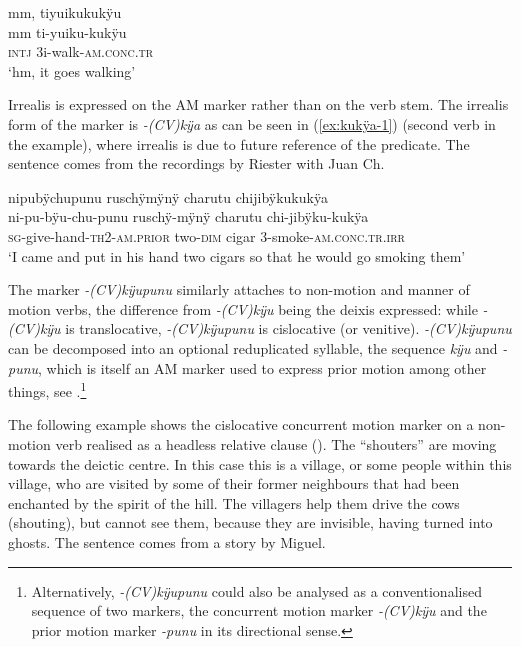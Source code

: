 \ea\label{ex:kukÿu-manner-3}
\begingl 
\glpreamble mm, tiyuikukukÿu\\
\gla mm ti-yuiku-kukÿu\\ 
\glb \textsc{intj} 3i-walk-\textsc{am.conc.tr}\\ 
\glft ‘hm, it goes walking’\\ 
\endgl
\trailingcitation{[mox-e110914l-1.150]}
\xe

Irrealis is expressed on the AM marker rather than on the verb stem. The irrealis form of the marker is \textit{-(CV)kÿa} as can be seen in (\ref{ex:kukÿa-1}) (second verb in the example), where irrealis is due to future reference of the predicate. The sentence comes from the recordings by Riester with Juan Ch.

\ea\label{ex:kukÿa-1}
\begingl 
\glpreamble nipubÿchupunu ruschÿmÿnÿ charutu chijibÿkukukÿa\\
\gla ni-pu-bÿu-chu-punu ruschÿ-mÿnÿ charutu chi-jibÿku-kukÿa\\ 
\textsc{sg}-give-hand-\textsc{th}2-\textsc{am.prior} two-\textsc{dim} cigar 3-smoke-\textsc{am.conc.tr.irr}\\ 
\glft ‘I came and put in his hand two cigars so that he would go smoking them’\\ 
\endgl
\trailingcitation{[nxx-p630101g-1.035-036]}
\xe


The marker \textit{-(CV)kÿupunu} similarly attaches to non-motion and  manner of motion verbs, the difference from \textit{-(CV)kÿu} being the deixis expressed: while \textit{-(CV)kÿu} is translocative, \textit{-(CV)kÿupunu} is cislocative (or venitive). \textit{-(CV)kÿupunu} can be decomposed into an optional reduplicated syllable, the sequence \textit{kÿu} and \textit{-punu}, which is itself an AM marker used to express prior motion among other things, see .\footnote{Alternatively, \textit{-(CV)kÿupunu} could also be analysed as a conventionalised sequence of two markers, the concurrent motion marker \textit{-(CV)kÿu} and the prior motion marker \textit{-punu} in its directional sense.} 

The following example shows the cislocative concurrent motion marker on a non-motion verb realised as a headless relative clause (). The “shouters” are moving towards the deictic centre. In this case this is a village, or some people within this village, who are visited by some of their former neighbours that had been enchanted by the spirit of the hill. The villagers help them drive the cows (shouting), but cannot see them, because they are invisible, having turned into ghosts. The sentence comes from a story by Miguel.

